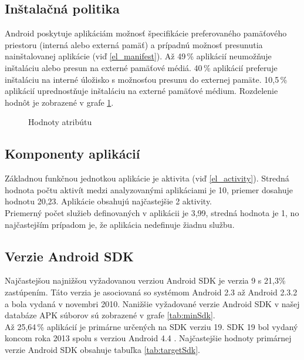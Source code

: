 \subsection*{Inštalačná politika}
Android poskytuje aplikáciám možnosť špecifikácie preferovaného pamäťového priestoru (interná alebo externá pamäť) a prípadnú možnosť presunutia nainštalovanej aplikácie (viď \ref{el_manifest}). Až 49\,\% aplikácií neumožňuje inštaláciu alebo presun na externé pamäťové médiá.  40\,\% aplikácií preferuje inštaláciu na interné úložisko s možnosťou presunu do externej pamäte. 10,5\,\% aplikácií uprednostňuje inštaláciu na externé pamäťové médium. Rozdelenie hodnôt je zobrazené v grafe \ref{fig:installLoc}.

\begin{figure}[!htbp]
\centering
{}
\label{fig:installLoc}
\caption{Hodnoty atribútu }
\end{figure}

\subsection*{Komponenty aplikácií}

Základnou funkčnou jednotkou aplikácie je aktivita (viď \ref{el_activity}). Stredná hodnota počtu aktivít medzi analyzovanými aplikáciami je  10, priemer dosahuje hodnotu 20,23. Aplikácie obsahujú najčastejšie 2 aktivity.\\Priemerný počet služieb definovaných v aplikácii je 3,99, stredná hodnota je 1, no najčastejším prípadom je, že aplikácia nedefinuje žiadnu službu.

\subsection*{Verzie Android SDK}

Najčastejšou najnižšou vyžadovanou verziou Android SDK je verzia 9 s 21,3\% zastúpením. Táto verzia je asociovaná so systémom Android 2.3 až Android 2.3.2  a bola vydaná v novembri 2010. Nanižšie vyžadované verzie Android SDK v našej databáze APK súborov sú zobrazené v grafe \ref{tab:minSdk}.
\\Až 25,64\,\% aplikácií je primárne určených na SDK verziu 19. SDK 19 bol vydaný koncom roka 2013 spolu s verziou Android 4.4 . Najčastejšie hodnoty primárnej verzie Android SDK obsahuje tabuľka \ref{tab:targetSdk}.

